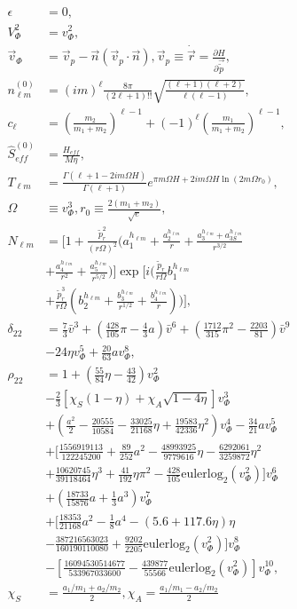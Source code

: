 \documentclass[prd,aps,a4paper,superscriptaddress,twocolumn,footinbib,showpacs]{revtex4}
\begin{document}
\begin{align}
\epsilon&=0,\\
V_\Phi^2&=v_\Phi^2,\\
\vec{v}_\Phi&=\vec{v}_p-\vec{n}(\vec{v}_p\cdot\vec{n}),\vec{v}_p\equiv\dot{\vec{r}}=\frac{\partial H}{\partial\vec{\tilde{p}}},\\
n^{(0)}_{\ell m}&=(im)^\ell\frac{8\pi}{(2\ell+1)!!}\sqrt{\frac{(\ell+1)(\ell+2)}{\ell(\ell-1)}},\\
c_{\ell}&=(\frac{m_2}{m_1+m_2})^{\ell-1}+(-1)^\ell(\frac{m_1}{m_1+m_2})^{\ell-1},\\
\hat{S}_{eff}^{(0)}&=\frac{H_{eff}}{M\eta},\\
T_{\ell m}&=\frac{\Gamma(\ell+1-2im\Omega H)}{\Gamma(\ell+1)}e^{\pi m\Omega H+2im\Omega H\ln(2m\Omega r_0)},\\
\Omega&\equiv v_\Phi^3, r_0\equiv\frac{2(m_1+m_2)}{\sqrt{e}},\\
N_{\ell m}&=[1+\frac{\tilde{p}_r^2}{(r\Omega)^2}(a_1^{h_{\ell m}}+\frac{a_2^{h_{\ell m}}}{r}+\frac{a_3^{h_{\ell m}}+a_{3S}^{h_{\ell m}}}{r^{3/2}}\nonumber\\
&+\frac{a_4^{h_{\ell m}}}{r^2}+\frac{a_5^{h_{\ell m}}}{r^{5/2}})]\exp[i(\frac{\tilde{p}_r}{r\Omega}b_1^{h_{\ell m}}\nonumber\\
&+\frac{\tilde{p}_r^3}{r\Omega}(b_2^{h_{\ell m}}
+\frac{b_3^{h_{\ell m}}}{r^{1/2}}+\frac{b_4^{h_{\ell m}}}{r}))],\\
\delta_{22}&=\frac{7}{3}\bar{v}^3+(\frac{428}{105}\pi-\frac{4}{3}a)\bar{v}^6+
(\frac{1712}{315}\pi^2-\frac{2203}{81})\bar{v}^9\nonumber\\
&-24\eta v_\Phi^5+\frac{20}{63}av_\Phi^8,\\
\rho_{22}&=1+(\frac{55}{84}\eta-\frac{43}{42})v_\Phi^2\nonumber\\
&-\frac{2}{3}[\chi_S(1-\eta)+\chi_A\sqrt{1-4\eta}]v_\Phi^3\nonumber\\
&+(\frac{a^2}{2}-\frac{20555}{10584}-\frac{33025}{21168}\eta+\frac{19583}{42336}\eta^2)v_\Phi^4-\frac{34}{21}av_\Phi^5\nonumber\\
&+[\frac{1556919113}{122245200}+\frac{89}{252}a^2-\frac{48993925}{9779616}\eta-\frac{6292061}{3259872}\eta^2\nonumber\\
&+\frac{10620745}{39118464}\eta^3+\frac{41}{192}\eta\pi^2-\frac{428}{105}\text{eulerlog}_2(v_\Phi^2)]v_\Phi^6\nonumber\\
&+(\frac{18733}{15876}a+\frac{1}{3}a^3)v_\Phi^7\nonumber\\
&+[\frac{18353}{21168}a^2-\frac{1}{8}a^4-(5.6+117.6\eta)\eta\nonumber\\
&-\frac{387216563023}{160190110080}+\frac{9202}{2205}\text{eulerlog}_2(v_\Phi^2)]v_\Phi^8\nonumber\\
&-[\frac{16094530514677}{533967033600}-\frac{439877}{55566}\text{eulerlog}_2(v_\Phi^2)]v_\Phi^{10},\\
\chi_S&=\frac{a_1/m_1+a_2/m_2}{2},\chi_A=\frac{a_1/m_1-a_2/m_2}{2}
\end{align}
\end{document}
